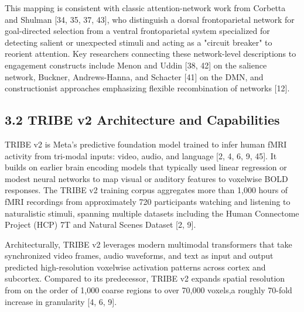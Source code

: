 \documentclass[11pt,letterpaper]{article}
\begin{document}
This mapping is consistent with classic attention-network work from Corbetta and Shulman [34, 35, 37, 43], who distinguish a dorsal frontoparietal network for goal-directed selection from a ventral frontoparietal system specialized for detecting salient or unexpected stimuli and acting as a "circuit breaker" to reorient attention. Key researchers connecting these network-level descriptions to engagement constructs include Menon and Uddin [38, 42] on the salience network, Buckner, Andrews-Hanna, and Schacter [41] on the DMN, and constructionist approaches emphasizing flexible recombination of networks [12].

\subsection{3.2 TRIBE v2 Architecture and Capabilities}

TRIBE v2 is Meta's predictive foundation model trained to infer human fMRI activity from tri-modal inputs: video, audio, and language [2, 4, 6, 9, 45]. It builds on earlier brain encoding models that typically used linear regression or modest neural networks to map visual or auditory features to voxelwise BOLD responses. The TRIBE v2 training corpus aggregates more than 1,000 hours of fMRI recordings from approximately 720 participants watching and listening to naturalistic stimuli, spanning multiple datasets including the Human Connectome Project (HCP) 7T and Natural Scenes Dataset [2, 9].

Architecturally, TRIBE v2 leverages modern multimodal transformers that take synchronized video frames, audio waveforms, and text as input and output predicted high-resolution voxelwise activation patterns across cortex and subcortex. Compared to its predecessor, TRIBE v2 expands spatial resolution from on the order of 1,000 coarse regions to over 70,000 voxels,a roughly 70-fold increase in granularity [4, 6, 9].
\end{document}
